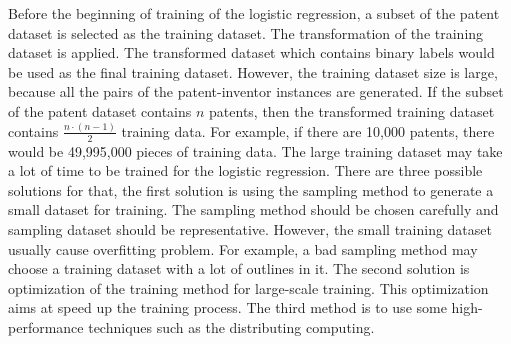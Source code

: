 Before the beginning of  training of the logistic regression, a subset of the patent dataset is selected as the training dataset. The transformation of the training dataset is applied. The transformed dataset which contains binary labels would be used as the final training dataset. However, the training dataset size is large, because all the pairs of the patent-inventor instances are generated. If the subset of the patent dataset contains $n$ patents, then the transformed training dataset contains $\frac{n \cdot (n-1)}{2} $ training data. For example, if there are 10,000 patents, there would be 49,995,000 pieces of training data. The large training dataset may take a lot of time to be trained for the logistic regression. There are three possible solutions for that, the first solution is using the sampling method to generate a small dataset for training. The sampling method should be chosen carefully and sampling dataset should be representative. However, the small training dataset usually cause overfitting problem. For example, a bad sampling method may choose a training dataset with a lot of outlines in it. The second solution is optimization of the training method for large-scale training. This optimization aims at speed up the training process. The third method is to use some high-performance techniques  such as the distributing computing. 

